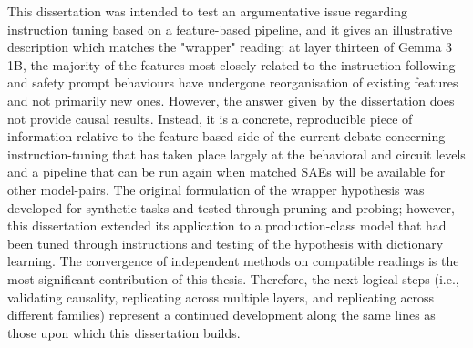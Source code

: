This dissertation was intended to test an argumentative issue regarding instruction tuning based on a feature-based pipeline, and it gives an illustrative description which matches the "wrapper" reading: at layer thirteen of Gemma 3 1B, the majority of the features most closely related to the instruction-following and safety prompt behaviours have undergone reorganisation of existing features and not primarily new ones. However, the answer given by the dissertation does not provide causal results. Instead, it is a concrete, reproducible piece of information relative to the feature-based side of the current debate concerning instruction-tuning that has taken place largely at the behavioral and circuit levels and a pipeline that can be run again when matched SAEs will be available for other model-pairs. The original formulation of the wrapper hypothesis was developed for synthetic tasks and tested through pruning and probing; however, this dissertation extended its application to a production-class model that had been tuned through instructions and testing of the hypothesis with dictionary learning. The convergence of independent methods on compatible readings is the most significant contribution of this thesis. Therefore, the next logical steps (i.e., validating causality, replicating across multiple layers, and replicating across different families) represent a continued development along the same lines as those upon which this dissertation builds.
